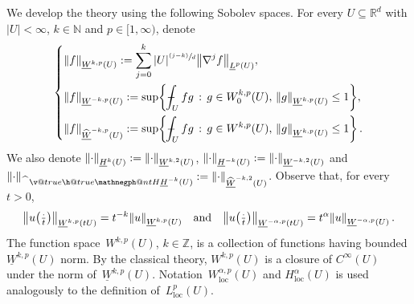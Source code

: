 \documentclass[11pt]{article} %
\makeatletter
\numberwithin{equation}{section}
\theoremstyle{definition}
\let\originalleft\left
\let\originalright\right
\renewcommand{\left}{\mathopen{}\mathclose\bgroup\originalleft}
\renewcommand{\right}{\aftergroup\egroup\originalright}
\newcommand*{\N}{\ensuremath{\mathbb{N}}}
\newcommand*{\Z}{\ensuremath{\mathbb{Z}}}
\newcommand*{\Rd}{\ensuremath{\mathbb{R}^d}}
\renewcommand*{\hat}{\widehat}
\newcommand{\qand}{\quad \mbox{and} \quad }
\def\Xint#1{\mathchoice
{\XXint\displaystyle\textstyle{#1}}%
{\XXint\textstyle\scriptstyle{#1}}%
{\XXint\scriptstyle\scriptscriptstyle{#1}}%
{\XXint\scriptscriptstyle\scriptscriptstyle{#1}}%
\!\int}
\def\XXint#1#2#3{{\setbox0=\hbox{$#1{#2#3}{\int}$}
\vcenter{\hbox{$#2#3$}}\kern-.5\wd0}}
\def\fint{\Xint-}
\newcommand{\negphantom}{\v@true\h@true\negph@nt}
\newcommand{\negph@nt}{\ifmmode\expandafter\mathpalette 
  \expandafter\mathnegph@nt\else\expandafter\makenegph@nt\fi}
\newcommand{\makenegph@nt}[1]{%
  \setbox\z@\hbox{\color@begingroup#1\color@endgroup}\finnegph@nt}
\newcommand{\finnegph@nt}{%
  \setbox\tw@\null 
  \ifv@ \ht\tw@\ht\z@\dp\tw@\dp\z@\fi \ifh@\wd\tw@-\wd\z@\fi\box\tw@}
\newcommand{\mathnegph@nt}[2]{%
  \setbox\z@\hbox{$\m@th #1{#2}$}\finnegph@nt}
\newcommand{\Hminusul}{\hat{\phantom{H}}\negphantom{H}\underline{H}^{-1}}
\newcommand{\Hminusulk}{\hat{\phantom{H}}\negphantom{H}\underline{H}^{-k}}
\makeatother
\begin{document}
\smallskip


We develop the theory using the following Sobolev spaces. For every $U\subseteq\Rd$ with $|U|<\infty$, $k\in\N$ and $p\in [1,\infty)$, denote
\begin{equation}
\label{e.underlinednorms}
\left\{ 
\begin{aligned}
&
\left\| f \right\|_{\underline{W}^{k,p}(U)} 
:=
\sum_{j=0}^k
|U|^{\sfrac {(j{-}k)}d} \left\| \nabla^j f \right\|_{\underline{L}^p(U)},
\\ & 
\left\| f \right\|_{\underline{W}^{-k,p}(U)} 
:=
\sup\left\{ 
\fint_U fg \,:\, 
g\in W^{k,p}_0(U), \, 
\left\| g \right\|_{\underline{W}^{k,p}(U)} 
\leq 1 \right\}, 
\\ & 
\left\| f \right\|_{\hat{\underline{W}}^{-k,p}(U)} 
:=
\sup\left\{ 
\fint_U fg \,:\, 
g\in W^{k,p}(U), \, 
\left\| g \right\|_{\underline{W}^{k,p}(U)} 
\leq 1 \right\} \,.
\end{aligned}
\right.
\end{equation}
We also denote $\left\| \cdot \right\|_{\underline{H}^k(U)}:= \left\| \cdot \right\|_{\underline{W}^{k,2}(U)}$, $\left\| \cdot \right\|_{\underline{H}^{-k}(U)}:= \left\| \cdot \right\|_{\underline{W}^{-k,2}(U)}$ and $\left\| \cdot \right\|_{\Hminusulk(U)}:= \left\| \cdot \right\|_{\hat{\underline{W}}^{-k,2}(U)}$. %
Observe that, for every $t>0$, 
\begin{equation} 
\label{e.Sobolev.scaling} 
\left\| u\left( \tfrac{\cdot}{t} \right) \right\|_{\underline{W}^{k,p}(t U)}  
= t^{-k} \left\| u \right\|_{\underline{W}^{k,p}(U)} 
\qand
\left\| u \left( \tfrac{\cdot}{t} \right) \right\|_{\underline{W}^{-\alpha,p}(t U)} = t^{\alpha} \left\| u  \right\|_{\underline{W}^{-\alpha,p}(U)}
\,.
\end{equation}
The function space~$W^{k,p}(U)$, $k\in \Z$, is a collection of functions having bounded $\underline{W}^{k,p}(U)$ norm. By the classical theory, $W^{k,p}(U)$ is a closure of $C^\infty(U)$ under the norm of~$\underline{W}^{k,p}(U)$. 
Notation~$W^{\alpha,p}_{\mathrm{loc}}(U)$ and $H^\alpha_{\mathrm{loc}}(U)$ is used analogously to the definition of~$L^p_{\mathrm{loc}}(U)$.  


\smallskip
\end{document}
